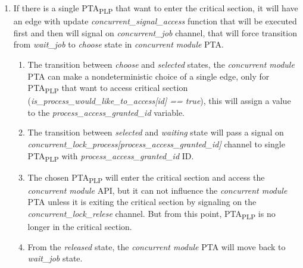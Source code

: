 \begin{enumerate}
\begin{enumerate}
\item If there is a single PTA\textsubscript{PLP} that want to enter the critical section, it will have an edge with update \textcolor{ColorUppaalFunction}{\textit{concurrent_signal_access}} function that will be executed first and then will signal on \textcolor{ColorUppaalChannel}{\textit{concurrent_job}} channel, that will force transition from \textcolor{ColorUppaalState}{\textit{wait_job}} to \textcolor{ColorUppaalState}{\textit{choose}} state in \textit{concurrent module} PTA.
\begin{enumerate} 
\item The transition between \textcolor{ColorUppaalState}{\textit{choose}} and \textcolor{ColorUppaalState}{\textit{selected}} states, the \textit{concurrent module} PTA can make a nondeterministic choice of a single edge, only for PTA\textsubscript{PLP} that want to access critical section (\textcolor{ColorEdgeGuard}{\textit{is_process_would_like_to_access[id] == true}}), this will assign a value to the \textcolor{ColorEdgeGuard}{\textit{process_access_granted_id}} variable.  
\item The transition between \textcolor{ColorUppaalState}{\textit{selected}} and \textcolor{ColorUppaalState}{\textit{waiting}} state will pass a signal on \textcolor{ColorUppaalChannel}{\textit{concurrent_lock_process[\textcolor{ColorEdgeGuard}{\textit{process_access_granted_id}}]}} channel to single PTA\textsubscript{PLP} with \textcolor{ColorEdgeGuard}{\textit{process_access_granted_id}} ID.  
\item The chosen PTA\textsubscript{PLP} will enter the critical section and access the \textit{concurrent module} API, but it can not influence the \textit{concurrent module} PTA unless it is exiting the critical section by signaling on the \textcolor{ColorUppaalChannel}{\textit{concurrent_lock_relese}} channel. But from this point, PTA\textsubscript{PLP} is no longer in the critical section. 
\item From the \textcolor{ColorUppaalState}{\textit{released}} state, the \textit{concurrent module} PTA will move back to \textcolor{ColorUppaalState}{\textit{wait_job}} state.
\end{enumerate} 

\end{enumerate}
\end{enumerate}
